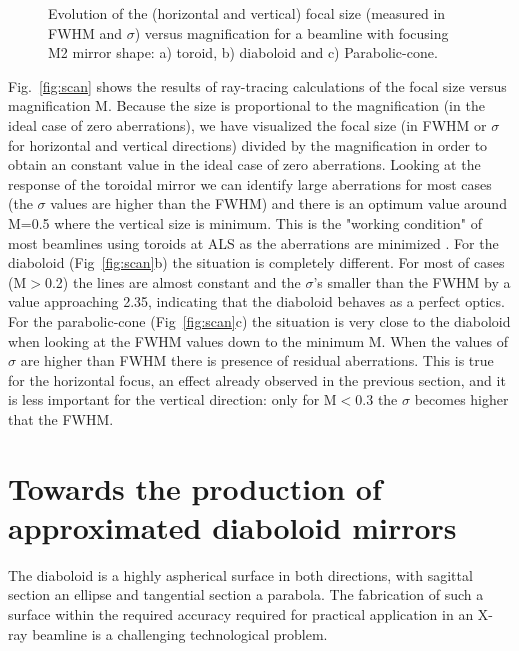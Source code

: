 \documentclass{iucr}              %
\newcommand{\inred}[1]{{\color{red}#1}}
\begin{document}
\begin{figure}
\caption{
Evolution of the (horizontal and vertical) focal size (measured in FWHM and $\sigma$) versus magnification for a beamline with focusing M2 mirror shape: a) toroid, b) diaboloid and c) Parabolic-cone. 
}
\end{figure}


Fig.~\ref{fig:scan} shows the results of ray-tracing calculations of the focal size versus magnification M. Because the size is proportional to the magnification (in the ideal case of zero aberrations), we have visualized the focal size (in FWHM or $\sigma$ for horizontal and vertical directions) divided by the magnification in order to obtain an constant value in the ideal case of zero aberrations. Looking at the response of the toroidal mirror we can identify large aberrations for most cases (the $\sigma$ values are higher than the FWHM) and there is an optimum value around M=0.5 where the vertical size is minimum. This is the "working condition" of most beamlines using toroids at ALS as the aberrations are minimized \cite{padmore2000,howells2000}. For the diaboloid (Fig~\ref{fig:scan}b) the situation is completely different. For most of cases (M$>$0.2) the lines are almost constant and the $\sigma$'s smaller than the FWHM by a value approaching 2.35, indicating that the diaboloid behaves as a perfect optics. For the parabolic-cone (Fig~\ref{fig:scan}c) the situation is very close to the diaboloid when looking at the FWHM values down to the minimum M. When the values of $\sigma$ are higher than FWHM there is presence of residual aberrations. This is true for the horizontal focus, an effect already observed in the previous section, and it is less important for the vertical direction: only for M$<$0.3 the $\sigma$ becomes higher that the FWHM.  

\inred{
\section{Towards the production of approximated diaboloid mirrors}
}

The diaboloid is a highly aspherical surface in both directions, with sagittal section an ellipse and tangential section a parabola. The fabrication of such a surface within the required accuracy required for practical application in an X-ray beamline is a challenging technological problem. 
\end{document}
